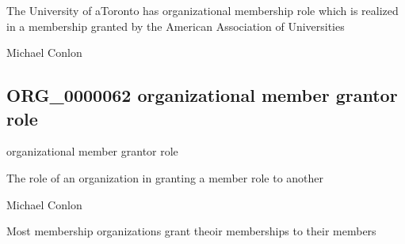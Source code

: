 \documentclass[letterpaper,10pt,english]{sphinxmanual}
\begin{document}
\begin{sphinxShadowBox}

\sphinxAtStartPar
The University of aToronto has organizational membership role which is realized in a membership granted by the American Association of Universities
\end{sphinxShadowBox}

\begin{sphinxShadowBox}

\sphinxAtStartPar
Michael Conlon 
\end{sphinxShadowBox}
\begin{quote}

\ignorespaces \end{quote}


\subsection{ORG\_0000062 \sphinxhyphen{} organizational member grantor role}
\label{\detokenize{doc-ORG_0000062:org-0000062-organizational-member-grantor-role}}\label{\detokenize{doc-ORG_0000062:index-0}}\label{\detokenize{doc-ORG_0000062::doc}}
\begin{sphinxShadowBox}

\sphinxAtStartPar
organizational member grantor role
\end{sphinxShadowBox}

\begin{sphinxShadowBox}

\sphinxAtStartPar
The role of an organization in granting a member role to another
\end{sphinxShadowBox}

\begin{sphinxShadowBox}

\sphinxAtStartPar
Michael Conlon 
\end{sphinxShadowBox}

\begin{sphinxShadowBox}

\sphinxAtStartPar
Most membership organizations grant theoir memberships to their members
\end{sphinxShadowBox}
\end{document}
